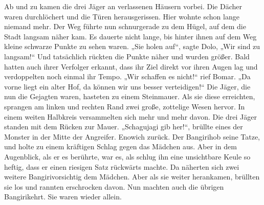 \documentclass[12pt,a4paper,onecolumn,twoside,ngerman]{book}
\newcommand{\Bangiri}{Bangiri}
\newcommand{\Eno}{Eno}
\newcommand{\Bomar}{Bomar}
\newcommand{\Do}{Dolo}
\begin{document}
Ab und zu kamen die drei Jäger an verlassenen Häusern vorbei. Die Dächer waren durchlöchert und die Türen herausgerissen. Hier wohnte schon lange niemand mehr. Der Weg führte nun schnurgerade zu dem Hügel, auf dem die Stadt langsam näher kam. Es dauerte nicht lange, bis hinter ihnen auf dem Weg kleine schwarze Punkte zu sehen waren. „Sie holen auf“, sagte \Do, „Wir sind zu langsam!“ Und tatsächlich rückten die Punkte näher und wurden größer. Bald hatten auch ihrer Verfolger erkannt, dass ihr Ziel direkt vor ihren Augen lag und verdoppelten noch einmal ihr Tempo. „Wir schaffen es nicht!“ rief \Bomar. „Da vorne liegt ein alter Hof, da können wir uns besser verteidigen!“ Die Jäger, die nun die Gejagten waren, hasteten zu einem Steinmauer. Als sie diese erreichten, sprangen am linken und rechten Rand zwei große, zottelige Wesen hervor. In einem weiten Halbkreis versammelten sich mehr und mehr davon. Die drei Jäger standen mit dem Rücken zur Mauer. „Schagujagi gib her!“, brüllte eines der Monster in der Mitte der Angreifer. \Eno wich zurück. Der \Bangiri hob seine Tatze, und holte zu einem kräftigen Schlag gegen das Mädchen aus. Aber in dem Augenblick, als er es berührte, war es, als schlug ihn eine unsichtbare Keule so heftig, dass er einen riesigen Satz rückwärts machte. Da näherten sich zwei weitere \Bangiri vorsichtig dem Mädchen. Aber als sie weiter herankamen, brüllten sie los und rannten erschrocken davon. Nun machten auch die übrigen \Bangiri kehrt. Sie waren wieder allein.
\end{document}
